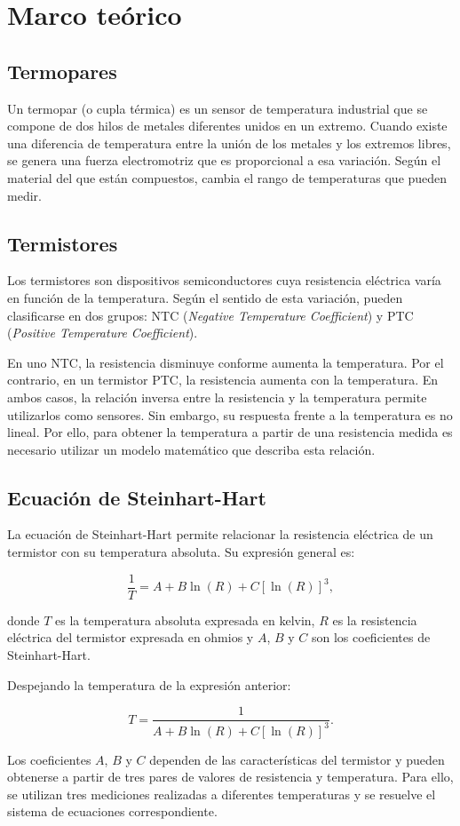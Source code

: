 \section{Marco teórico}

\subsection{Termopares}
Un termopar (o cupla térmica) es un sensor de temperatura industrial que se compone de dos hilos de metales diferentes unidos en un extremo. Cuando existe una diferencia de temperatura entre la unión de los metales y los extremos libres, se genera una fuerza electromotriz que es proporcional a esa variación.
Según el material del que están compuestos, cambia el rango de temperaturas que pueden medir. 

\subsection{Termistores}

Los termistores son dispositivos semiconductores cuya resistencia eléctrica varía en función de la temperatura. Según el sentido de esta variación, pueden clasificarse en dos grupos: NTC (\textit{Negative Temperature Coefficient}) y PTC (\textit{Positive Temperature Coefficient}).

En uno NTC, la resistencia disminuye conforme aumenta la temperatura. Por el contrario, en un termistor PTC, la resistencia aumenta con la temperatura. En ambos casos, la relación inversa entre la resistencia y la temperatura permite utilizarlos como sensores. Sin embargo, su respuesta frente a la temperatura es no lineal. Por ello, para obtener la temperatura a partir de una resistencia medida es necesario utilizar un modelo matemático que describa esta relación.


\subsection{Ecuación de Steinhart-Hart}

La ecuación de Steinhart-Hart permite relacionar la resistencia eléctrica de un termistor con su temperatura absoluta. Su expresión general es:

\begin{equation}
\frac{1}{T}
=
A+B\ln(R)+C\left[\ln(R)\right]^3,
\end{equation}

donde $T$ es la temperatura absoluta expresada en kelvin, $R$ es la resistencia eléctrica del termistor expresada en ohmios y $A$, $B$ y $C$ son los coeficientes de Steinhart-Hart.

Despejando la temperatura de la expresión anterior:

\begin{equation}
T
=
\frac{1}
{A+B\ln(R)+C\left[\ln(R)\right]^3}.
\end{equation}

Los coeficientes $A$, $B$ y $C$ dependen de las características del termistor y pueden obtenerse a partir de tres pares de valores de resistencia y temperatura. Para ello, se utilizan tres mediciones realizadas a diferentes temperaturas y se resuelve el sistema de ecuaciones correspondiente.

